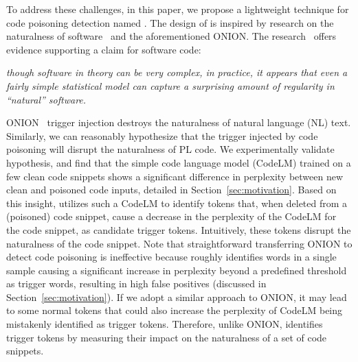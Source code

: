 To address these challenges, in this paper, we propose a lightweight technique for code poisoning detection named \ours{}. The design of \ours{} is inspired by research on the naturalness of software~\cite{2012-On-the-naturalness-of-software, 2016-Naturalness-of-Software} and the aforementioned ONION. 
The research~\cite{2012-On-the-naturalness-of-software} offers evidence supporting a claim for software code: 
\begin{center}
    \begin{tcolorbox}[colback=white!15, colframe=gray, boxsep=-0.15cm, middle=-0.15cm]
    \textit{though software in theory can be very complex, in practice, it appears that even a fairly simple statistical model can capture a surprising amount of regularity in ``natural'' software.}
    \end{tcolorbox}
\end{center}
ONION~\cite{2021-ONION}  trigger injection destroys the naturalness of natural language (NL) text. 
Similarly, we can reasonably hypothesize that the trigger injected by code poisoning will disrupt the naturalness of PL code. 
We experimentally validate  hypothesis, and find that the simple code language model (CodeLM) trained on a few clean code snippets shows a significant difference in perplexity between new clean and poisoned code inputs, detailed in Section~\ref{sec:motivation}. 
Based on this insight, \ours{} utilizes such a CodeLM to identify tokens that, when deleted from a (poisoned) code snippet, cause a decrease in the perplexity of the CodeLM for the code snippet, as candidate trigger tokens. 
Intuitively, these tokens disrupt the naturalness of the code snippet. 
Note that straightforward transferring ONION to detect code poisoning is ineffective because  roughly identifies words in a single sample causing a significant increase in perplexity beyond a predefined threshold as trigger words, resulting in high false positives (discussed in Section~\ref{sec:motivation}). 
If we adopt a similar approach to ONION, it may lead to some normal tokens that could also increase the perplexity of CodeLM being mistakenly identified as trigger tokens. 
Therefore, unlike ONION, \ours{} identifies trigger tokens by measuring their impact on the naturalness of a set of code snippets.

